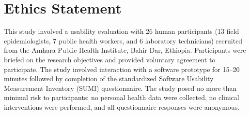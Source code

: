 \section*{Ethics Statement}
This study involved a usability evaluation with 26 human participants (13 field epidemiologists, 7 public health workers, and 6 laboratory technicians) recruited from the Amhara Public Health Institute, Bahir Dar, Ethiopia. Participants were briefed on the research objectives and provided voluntary agreement to participate. The study involved interaction with a software prototype for 15--20 minutes followed by completion of the standardized Software Usability Measurement Inventory (SUMI) questionnaire. The study posed no more than minimal risk to participants: no personal health data were collected, no clinical interventions were performed, and all questionnaire responses were anonymous.


